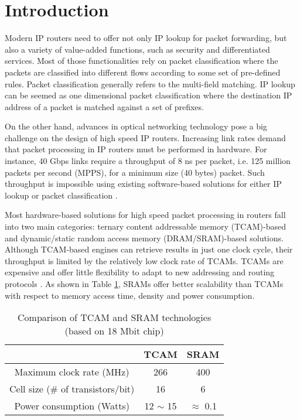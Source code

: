 \documentclass{sigcomm-alternate}
\begin{document}


\section{Introduction}
\label{sec:intro}

Modern IP routers need to offer not only IP lookup for packet forwarding, but also a variety of value-added functions, such as security and differentiated services. Most of those functionalities rely on packet classification where the packets are classified into different flows according to some set of pre-defined rules. Packet classification generally refers to the multi-field matching. IP lookup can be seemed as one dimensional packet classification where the destination IP address of a packet is matched against a set of prefixes. 

On the other hand, advances in optical networking technology pose a big challenge on the design of high speed IP routers. Increasing link rates demand that packet processing in IP routers must be performed in hardware. For instance, 40 Gbps links require a throughput of 8 ns per packet, i.e. 125 million packets per second (MPPS), for a minimum size (40 bytes) packet. Such throughput is impossible using existing software-based solutions for either IP lookup \cite{networkmag01:sanchez} or packet classification \cite{networkmag01:gupta}. 
  
Most hardware-based solutions for high speed packet processing in routers fall into two main categories: ternary content addressable memory (TCAM)-based and dynamic/static random access memory (DRAM/SRAM)-based solutions. Although TCAM-based engines can retrieve results in just one clock cycle, their throughput is limited by the relatively low clock rate of TCAMs. TCAMs are expensive and offer little flexibility to adapt to new addressing and routing protocols \cite{infocom08:jiang}. As shown in Table \ref{tb:tcamvssram}, SRAMs offer better scalability than TCAMs with respect to memory access time, density and power consumption. 
  
\begin{table}[htb]
\caption{Comparison of TCAM and SRAM technologies (based on 18 Mbit chip)}
\label{tb:tcamvssram}
\vspace{-0.11in}
\begin{center}
\begin{tabular}{|c|c|c|}
\hline
 & TCAM  & SRAM \\
\hline
\hline
Maximum clock rate (MHz) & 266  \cite{renesas} & 400 \cite{cypress, samsung} \\
\hline
Cell size (\# of transistors/bit) & 16 & 6 \\
\hline
Power consumption (Watts) & 12 $\sim$ 15 \cite{ton06:zheng} & $\approx$ 0.1 \cite{cacti}\\
\hline
\end{tabular}
\end{center}
\end{table}
\end{document}

